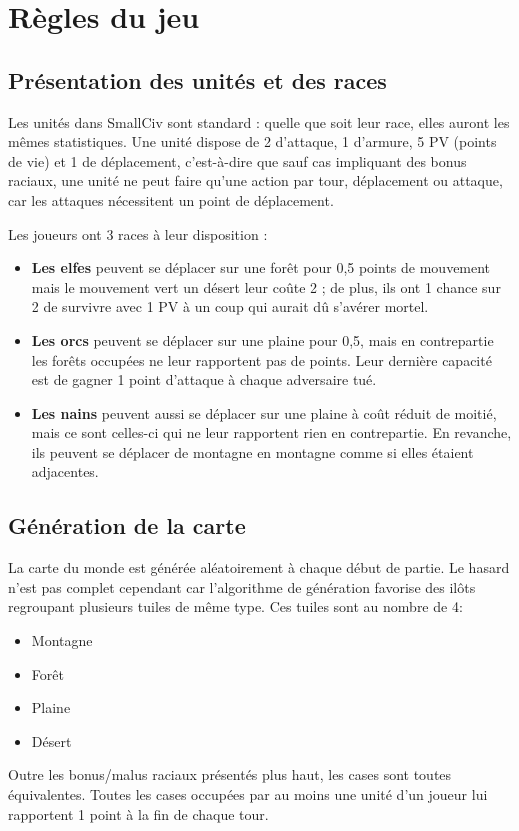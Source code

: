 \section{Règles du jeu}

\subsection{Présentation des unités et des races}
Les unités dans SmallCiv sont standard : quelle que soit leur race, elles auront les mêmes statistiques. Une unité dispose de 2 d'attaque, 1 d'armure, 5 PV (points de vie) et 1 de déplacement, c'est-à-dire que sauf cas impliquant des bonus raciaux, une unité ne peut faire qu'une action par tour, déplacement ou attaque, car les attaques nécessitent un point de déplacement. \newline

Les joueurs ont 3 races à leur disposition :
\begin{itemize}\renewcommand{\labelitemi}{$\bullet$}
\item \textbf{Les elfes} peuvent se déplacer sur une forêt pour 0,5 points de mouvement mais le mouvement vert un désert leur coûte 2 ; de plus, ils ont 1 chance sur 2 de survivre avec 1 PV à un coup qui aurait dû s'avérer mortel.
\item \textbf{Les orcs} peuvent se déplacer sur une plaine pour 0,5, mais en contrepartie les forêts occupées ne leur rapportent pas de points. Leur dernière capacité est de gagner 1 point d'attaque à chaque adversaire tué.
\item \textbf{Les nains} peuvent aussi se déplacer sur une plaine à coût réduit de moitié, mais ce sont celles-ci qui ne leur rapportent rien en contrepartie. En revanche, ils peuvent se déplacer de montagne en montagne comme si elles étaient adjacentes.
\end{itemize}

\subsection{Génération de la carte}
La carte du monde est générée aléatoirement à chaque début de partie. Le hasard n'est pas complet cependant car l'algorithme de génération favorise des ilôts regroupant plusieurs tuiles de même type. Ces tuiles sont au nombre de 4:
\begin{itemize}
\item Montagne
\item Forêt
\item Plaine 
\item Désert
\end{itemize}
Outre les bonus/malus raciaux présentés plus haut, les cases sont toutes équivalentes. Toutes les cases occupées par au moins une unité d'un joueur lui rapportent 1 point à la fin de chaque tour. \newline

